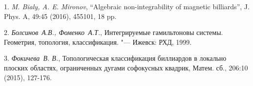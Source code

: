
\litlist

1. {\it M. Bialy, A. E. Mironov}, “Algebraic non-integrability of magnetic billiards”,
J. Phys. A, 49:45 (2016), 455101, 18 pp.


2. {\it Болсинов~А.В., Фоменко~А.Т.}, Интегрируемые гамильтоновы системы. Геометрия, топология, классификация.
"--- Ижевск: РХД, 1999.

3. {\it Фокичева~В. В.}, Топологическая классификация биллиардов в локально плоских областях, ограниченных дугами софокусных квадрик, Матем. сб., 206:10 (2015), 127-176.
